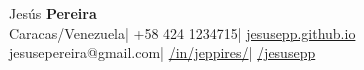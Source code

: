 \documentclass[10pt]{article}
\begin{document}
\begin{center}
    \color{white}
    {\fontsize{40}{60}\selectfont Jesús \textbf{Pereira}}\vspace{4pt}\\
    \faMapMarker\hspace{3pt}Caracas\hspace{5pt}/\hspace{5pt}Venezuela\hspace{25pt}| \hspace{25pt}\faMobile\hspace{2pt} +58 424 1234715\hspace{25pt}|
    \hspace{25pt}\faChain\hspace{2pt}\href{https://jesusepp.github.io/}{jesusepp.github.io}\\\vspace{2pt}
    \faEnvelope\hspace{2pt}jesusepereira@gmail.com\hspace{25pt}|
    \hspace{25pt}\faLinkedinSquare\hspace{3pt}\href{https://www.linkedin.com/in/jeppires/}{/in/jeppires/}\hspace{25pt}|
    \hspace{25pt} \faGithubSquare\hspace{3pt}\href{https://github.com/jesusepp}{/jesusepp}
\end{center}

\vspace{20pt}
\end{document}
